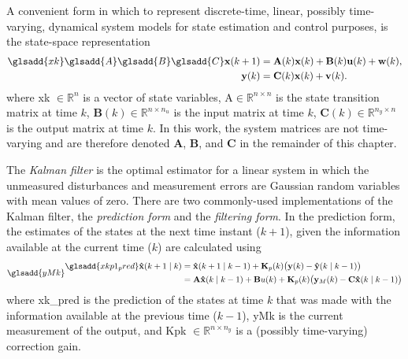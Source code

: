 A convenient form in which to represent discrete-time, linear, possibly time-varying, dynamical system models for state estimation and control purposes, is the state-space representation
\begin{equation} \label{eq:ss_rep_uwy}
	\begin{aligned} \glsadd{xk} \glsadd{A} \glsadd{B} \glsadd{C}
		\mathbf{x}(k+1) &= \mathbf{A}(k) \mathbf{x}(k) + \mathbf{B}(k) \mathbf{u}(k) + \mathbf{w}(k), \\
		\mathbf{y}(k) &= \mathbf{C}(k) \mathbf{x}(k) + \mathbf{v}(k).
	\end{aligned}
\end{equation}
where \gls{xk} $\in \mathbb{R}^n$ is a vector of state variables, \gls{A}$\in \mathbb{R}^{n \times n}$ is the state transition matrix at time $k$, $\mathbf{B}(k) \in \mathbb{R}^{n \times n_u}$ is the input matrix at time $k$, $\mathbf{C}(k) \in \mathbb{R}^{n_y \times n}$ is the output matrix at time $k$. In this work, the system matrices are not time-varying and are therefore denoted $\mathbf{A}$, $\mathbf{B}$, and $\mathbf{C}$ in the remainder of this chapter.

The \textit{Kalman filter} \citep{kalman_new_1960} is the optimal estimator for a linear system in which the unmeasured disturbances and measurement errors are Gaussian random variables with mean values of zero. There are two commonly-used implementations of the Kalman filter, the \textit{prediction form} and the \textit{filtering form}. In the prediction form, the estimates of the states at the next time instant ($k+1$), given the information available at the current time ($k$) are calculated using
\begin{equation} \glsadd{yMk}
\begin{aligned} \label{eq:xkp1_hat_p}
	\glsadd{xkp1_pred}\mathbf{\hat{x}}(k+1 \mid k) &= \mathbf{\hat{x}}(k+1 \mid k-1) + \mathbf{K}_p(k) \big( \mathbf{y}(k) - \mathbf{\hat{y}}(k \mid k-1) \big) \\
	&= \mathbf{A}\mathbf{\hat{x}}(k \mid k-1) + \mathbf{B}u(k) + \mathbf{K}_p(k) \big( \mathbf{y}_M(k) - \mathbf{C} \mathbf{\hat{x}}(k \mid k-1) \big)
\end{aligned}
\end{equation}
where \gls{xk_pred} is the prediction of the states at time $k$ that was made with the information available at the previous time ($k-1$), \gls{yMk} is the current measurement of the output, and \gls{Kpk} $\in \mathbb{R}^{n \times n_y}$ is a (possibly time-varying) correction gain.

